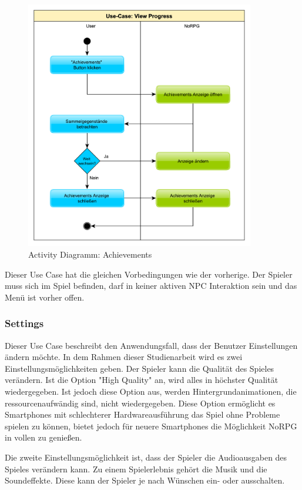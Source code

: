 			\begin{figure}[htbp]
				\centering 
				\label{umlAchievements}
				\includegraphics[width=10cm]{pics/Achievements.pdf}
				\caption{Activity Diagramm: Achievements}
			\end{figure}
			
			Dieser Use Case hat die gleichen Vorbedingungen wie der vorherige. Der Spieler muss sich im Spiel befinden, darf in keiner aktiven NPC Interaktion sein und das Menü ist vorher offen.
		
		\subsubsection{Settings}
			Dieser Use Case beschreibt den Anwendungsfall, dass der Benutzer Einstellungen ändern möchte. In dem Rahmen dieser Studienarbeit wird es zwei Einstellungsmöglichkeiten geben. Der Spieler kann die Qualität des Spieles verändern. Ist die Option "High Quality" an, wird alles in höchster Qualität wiedergegeben. Ist jedoch diese Option aus, werden Hintergrundanimationen, die ressourcenaufwändig sind, nicht wiedergegeben. Diese Option ermöglicht es Smartphones mit schlechterer Hardwareausführung das Spiel ohne Probleme spielen zu können, bietet jedoch für neuere Smartphones die Möglichkeit NoRPG in vollen zu genießen.
			
			Die zweite Einstellungsmöglichkeit ist, dass der Spieler die Audioausgaben des Spieles verändern kann. Zu einem Spielerlebnis gehört die Musik und die Soundeffekte. Diese kann der Spieler je nach Wünschen ein- oder ausschalten.
			
